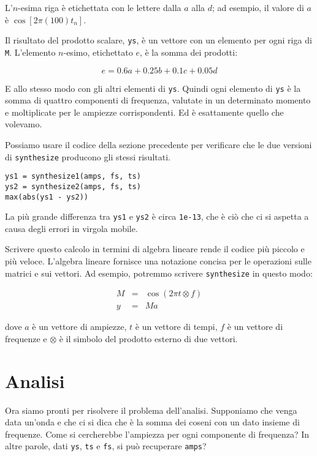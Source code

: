 \documentclass[12pt]{book} \usepackage[width=5.5in,height=8.5in, hmarginratio=3:2,vmarginratio=1:1]{geometry}
\begin{document}
L'$n$-esima riga è etichettata con le lettere dalla $a$ alla $d$; ad esempio, il valore di $a$ è $\cos [2 \pi (100) t_n]$.

Il risultato del prodotto scalare, {\tt ys}, è un vettore con un elemento per ogni riga di {\tt M}. L'elemento $n$-esimo, etichettato $e$, è la somma dei prodotti:

%
\[ e = 0.6 a + 0.25 b + 0.1 c + 0.05 d \] 

%
E allo stesso modo con gli altri elementi di {\tt ys}. Quindi ogni elemento di {\tt ys} è la somma di quattro componenti di frequenza, valutate in un determinato momento e moltiplicate per le ampiezze corrispondenti. Ed è esattamente quello che volevamo.

Possiamo usare il codice della sezione precedente per verificare che le due versioni di {\tt synthesize} producono gli stessi risultati.

\begin{verbatim} 
ys1 = synthesize1(amps, fs, ts)
ys2 = synthesize2(amps, fs, ts)
max(abs(ys1 - ys2))
 \end{verbatim} 

La più grande differenza tra {\tt ys1} e {\tt ys2} è circa {\tt 1e-13}, che è ciò che ci si aspetta a causa degli errori in virgola mobile.

Scrivere questo calcolo in termini di algebra lineare rende il codice più piccolo e più veloce. L'algebra lineare fornisce una notazione concisa per le operazioni sulle matrici e sui vettori. Ad esempio, potremmo scrivere {\tt synthesize} in questo modo:

%
\begin{eqnarray*} M&=& \cos (2 \pi t \otimes f) \\ y&=&M a \end{eqnarray*} 

%
dove $a$ è un vettore di ampiezze, $t$ è un vettore di tempi, $f$ è un vettore di frequenze e $\otimes$ è il simbolo del prodotto esterno di due vettori.

\section{Analisi} \label{analysis} 

Ora siamo pronti per risolvere il problema dell'analisi. Supponiamo che venga data un'onda e che ci si dica che è la somma dei coseni con un dato insieme di frequenze. Come si cercherebbe l'ampiezza per ogni componente di frequenza? In altre parole, dati {\tt ys}, {\tt ts} e {\tt fs}, si può recuperare {\tt amps}?
\end{document}
